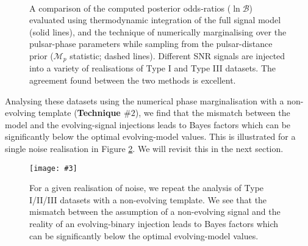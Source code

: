 \documentclass[twocolappendix,tighten]{emulateapj}
\newcommand{\incgraph}[3]{\texttt{[image: \#3]}}
\begin{document}
\begin{figure}
  \centering
   \subfloat[]{\incgraph{0}{0.5}{TypeI_ev.pdf}}\\
   \subfloat[]{\incgraph{0}{0.5}{TypeIII_ev.pdf}}
   \caption{\label{fig:typeIII_bayes}A comparison of the computed posterior odds-ratios ($\ln\mathcal{B}$) evaluated using thermodynamic integration of the full signal model (solid lines), and the technique of numerically marginalising over the pulsar-phase parameters while sampling from the pulsar-distance prior ({\bf $\mathcal{M}_p$} statistic; dashed lines). Different SNR signals are injected into a variety of realisations of Type I and Type III datasets. The agreement found between the two methods is excellent.} 
 \end{figure}


Analysing these datasets using the numerical phase marginalisation with a non-evolving template ({\bf Technique $\#2$}), we find that the mismatch between the model and the evolving-signal injections leads to Bayes factors which can be significantly below the optimal evolving-model values. This is illustrated for a single noise realisation in Figure \ref{fig:EvNonEv_BayesCompare}. We will revisit this in the next section.

\begin{figure}
  \centering
\incgraph{0}{0.5}{Evolve_NonEvolve_BayesSNR_13Feb2014.pdf}
\caption{\label{fig:EvNonEv_BayesCompare}For a given realisation of noise, we repeat the analysis of Type I/II/III datasets with a non-evolving template. We see that the mismatch between the assumption of a non-evolving signal and the reality of an evolving-binary injection leads to Bayes factors which can be significantly below the optimal evolving-model values.} 
 \end{figure}
\end{document}
